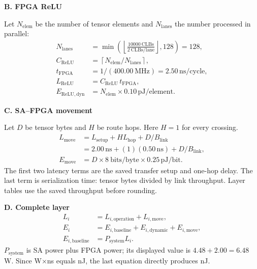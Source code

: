 \documentclass[10pt]{article}
\newcommand{\ns}{\,\mathrm{ns}}
\newcommand{\pj}{\,\mathrm{pJ}}
\begin{document}
\newpage
\textbf{B. FPGA ReLU}

Let $N_{\mathrm{elem}}$ be the number of tensor elements and
$N_{\mathrm{lanes}}$ the number processed in parallel:
\begin{align*}
N_{\mathrm{lanes}}
 &=\min\!\left(\left\lfloor\frac{10000\ \mathrm{CLBs}}
 {2\ \mathrm{CLBs/lane}}\right\rfloor,128\right)=128,\\
C_{\mathrm{ReLU}}
 &=\left\lceil N_{\mathrm{elem}}/N_{\mathrm{lanes}}\right\rceil,\\
t_{\mathrm{FPGA}}
 &=1/(400.00\ \mathrm{MHz})=2.50\ns/\mathrm{cycle},\\
L_{\mathrm{ReLU}}
 &=C_{\mathrm{ReLU}}\,t_{\mathrm{FPGA}},\\
E_{\mathrm{ReLU,dyn}}
 &=N_{\mathrm{elem}}\times0.10\pj/\mathrm{element}.
\end{align*}

\textbf{C. SA--FPGA movement}

Let $D$ be tensor bytes and $H$ be route hops.  Here $H=1$ for every crossing.
\begin{align*}
L_{\mathrm{move}}
 &=L_{\mathrm{setup}}+H L_{\mathrm{hop}}+D/B_{\mathrm{link}}\\
 &=2.00\ns+(1)(0.50\ns)+D/B_{\mathrm{link}},\\
E_{\mathrm{move}}
 &=D\times8\ \mathrm{bits/byte}\times0.25\pj/\mathrm{bit}.
\end{align*}
The first two latency terms are the saved transfer setup and one-hop delay.
The last term is serialization time: tensor bytes divided by link throughput.
Layer tables use the saved throughput before rounding.

\textbf{D. Complete layer}
\begin{align*}
L_i &=L_{i,\mathrm{operation}}+L_{i,\mathrm{move}},\\
E_i &=E_{i,\mathrm{baseline}}+E_{i,\mathrm{dynamic}}+E_{i,\mathrm{move}},\\
E_{i,\mathrm{baseline}}&=P_{\mathrm{system}}L_i.
\end{align*}
$P_{\mathrm{system}}$ is SA power plus FPGA power; its displayed value is
$4.48+2.00=6.48$ W.  Since W$\times$ns equals nJ, the last equation directly
produces nJ.
\end{document}
